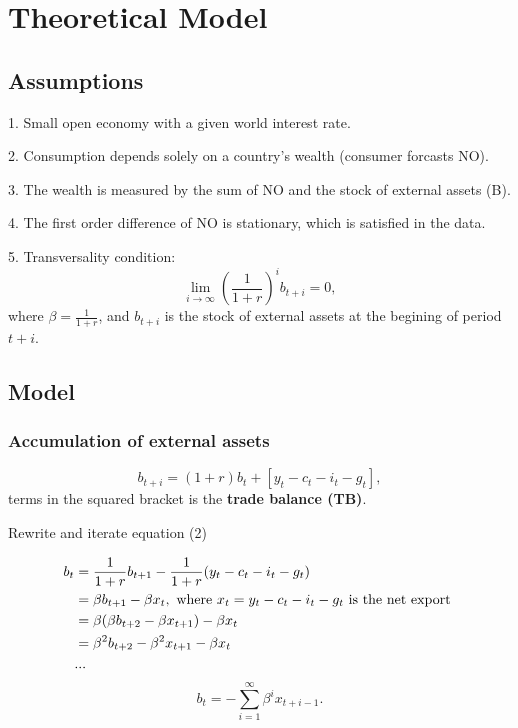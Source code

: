 \documentclass[12pt]{article}
\begin{document}
\section{Theoretical Model}
\subsection{Assumptions}
1. Small open economy with a given world interest rate.

2. Consumption depends solely on a country's wealth (consumer forcasts NO).

3. The wealth is measured by the sum of NO and the stock of external assets (B).

4. The first order difference of NO is stationary, which is satisfied in the data.

5. Transversality condition:
\begin{equation}
\lim_{i \to \infty} \left( \frac{1}{1 + r} \right) ^{i}	b_{t + i} = 0, 
\end{equation}
where $ \beta = \frac{1}{1 + r} $, and $ b_{t + i} $ is the stock of external assets
at the begining of period $ t + i $.


\subsection{Model}
\subsubsection{Accumulation of external assets}
\begin{equation}
b_{t + i} = (1 + r)b_{t} + \left[ y_{t} - c_{t} - i_{t} - g_{t} \right],
\end{equation}
terms in the squared bracket is the {\textbf {trade balance (TB)}}.

Rewrite and iterate equation (2)

\begin{align*}
b_{t} &= \frac{1}{1 + r}b_{t + 1} - \frac{1}{1 + r}(y_{t} - c_{t} - i_{t} - g_{t})\\
 &= \beta b_{t + 1} -  \beta x_{t}, \text{ where $ x_{t} = y_{t} - c_{t} - i_{t} - 
 g_{t}$ is the net export }\\
 &= \beta(\beta b_{t + 2} - \beta x_{t + 1}) - \beta x_{t}\\
 &= \beta^{2} b_{t + 2} - \beta^{2} x_{t + 1}  - \beta x_{t}\\
 &...\\
\end{align*}
\begin{equation}
b_{t} =  - \sum\limits_{i = 1} ^\infty \beta^{i} x_{t + i - 1}	.
\end{equation}
\end{document}
